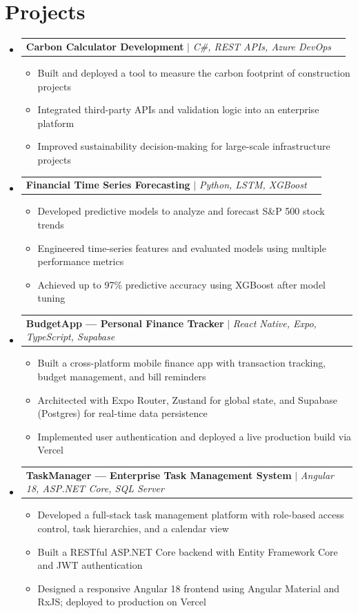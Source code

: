 \documentclass[letterpaper,10pt]{article}
\makeatletter
\newcommand{\resumeItem}[1]{\item\small{#1 \vspace{-2pt}}}
\newcommand{\resumeProjectHeading}[2]{
  \vspace{-1pt}\item
  \begin{tabular*}{0.97\textwidth}{l@{\extracolsep{\fill}}r}
    \small#1 & #2 \\
  \end{tabular*}\vspace{-6pt}
}
\newcommand{\resumeSubHeadingListStart}{\begin{itemize}[leftmargin=0.15in, label={}]}
\newcommand{\resumeSubHeadingListEnd}{\end{itemize}}
\newcommand{\resumeItemListStart}{\begin{itemize}[itemsep=0pt]}
\newcommand{\resumeItemListEnd}{\end{itemize}\vspace{-4pt}}
\makeatother
\begin{document}
\section{Projects}
\resumeSubHeadingListStart

\resumeProjectHeading
  {\textbf{Carbon Calculator Development} $|$ \emph{C\#, REST APIs, Azure DevOps}}{}
\resumeItemListStart
  \resumeItem{Built and deployed a tool to measure the carbon footprint of construction projects}
  \resumeItem{Integrated third-party APIs and validation logic into an enterprise platform}
  \resumeItem{Improved sustainability decision-making for large-scale infrastructure projects}
\resumeItemListEnd

\resumeProjectHeading
  {\textbf{Financial Time Series Forecasting} $|$ \emph{Python, LSTM, XGBoost}}{}
\resumeItemListStart
  \resumeItem{Developed predictive models to analyze and forecast S\&P 500 stock trends}
  \resumeItem{Engineered time-series features and evaluated models using multiple performance metrics}
  \resumeItem{Achieved up to 97\% predictive accuracy using XGBoost after model tuning}
\resumeItemListEnd

\resumeProjectHeading
  {\textbf{BudgetApp --- Personal Finance Tracker} $|$ \emph{React Native, Expo, TypeScript, Supabase}}{}
\resumeItemListStart
  \resumeItem{Built a cross-platform mobile finance app with transaction tracking, budget management, and bill reminders}
  \resumeItem{Architected with Expo Router, Zustand for global state, and Supabase (Postgres) for real-time data persistence}
  \resumeItem{Implemented user authentication and deployed a live production build via Vercel}
\resumeItemListEnd

\resumeProjectHeading
  {\textbf{TaskManager --- Enterprise Task Management System} $|$ \emph{Angular 18, ASP.NET Core, SQL Server}}{}
\resumeItemListStart
  \resumeItem{Developed a full-stack task management platform with role-based access control, task hierarchies, and a calendar view}
  \resumeItem{Built a RESTful ASP.NET Core backend with Entity Framework Core and JWT authentication}
  \resumeItem{Designed a responsive Angular 18 frontend using Angular Material and RxJS; deployed to production on Vercel}
\resumeItemListEnd

\resumeSubHeadingListEnd

\end{document}
